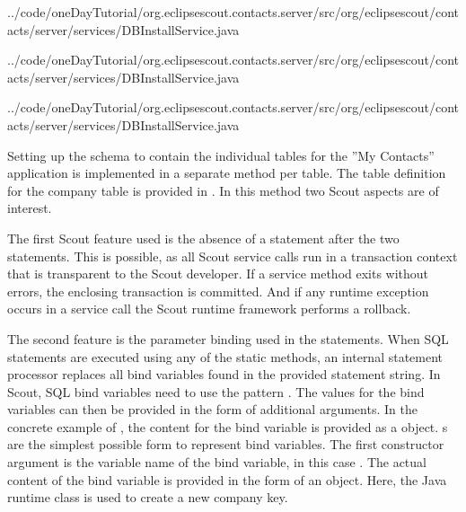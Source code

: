 \documentclass[a4paper,10pt,twoside]{book}
\begin{document}

{../code/oneDayTutorial/org.eclipsescout.contacts.server/src/org/eclipsescout/contacts/server/services/DBInstallService.java}


{../code/oneDayTutorial/org.eclipsescout.contacts.server/src/org/eclipsescout/contacts/server/services/DBInstallService.java}


{../code/oneDayTutorial/org.eclipsescout.contacts.server/src/org/eclipsescout/contacts/server/services/DBInstallService.java}

Setting up the schema to contain the individual tables for the ''My Contacts'' application is implemented in a separate method per table. 
The table definition for the company table is provided in . 
In this method two Scout aspects are of interest. 

The first Scout feature used is the absence of a  statement after the two  statements. 
This is possible, as all Scout service calls run in a transaction context that is transparent to the Scout developer. 
If a service method exits without errors, the enclosing transaction is committed. 
And if any runtime exception occurs in a service call the Scout runtime framework performs a rollback.

The second feature is the parameter binding used in the  statements. 
When SQL statements are executed using any of the static  methods, an internal statement processor replaces all bind variables found in the provided statement string. 
In Scout, SQL bind variables need to use the pattern . 
The values for the bind variables can then be provided in the form of additional arguments. 
In the concrete example of , the content for the bind variable  is provided as a  object. 
s are the simplest possible form to represent bind variables. 
The first constructor argument is the variable name of the bind variable, in this case . 
The actual content of the bind variable is provided in the form of an object. 
Here, the Java runtime class  is used to create a new company key. 
\end{document}
